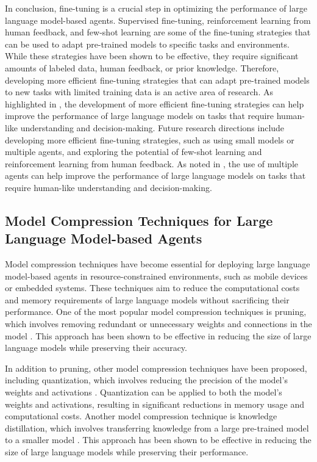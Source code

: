 \documentclass[11pt,a4paper]{article}
\begin{document}
In conclusion, fine-tuning is a crucial step in optimizing the performance of large language model-based agents. Supervised fine-tuning, reinforcement learning from human feedback, and few-shot learning are some of the fine-tuning strategies that can be used to adapt pre-trained models to specific tasks and environments. While these strategies have been shown to be effective, they require significant amounts of labeled data, human feedback, or prior knowledge. Therefore, developing more efficient fine-tuning strategies that can adapt pre-trained models to new tasks with limited training data is an active area of research. As highlighted in \cite{doi:10.34133/research.0655}, the development of more efficient fine-tuning strategies can help improve the performance of large language models on tasks that require human-like understanding and decision-making. Future research directions include developing more efficient fine-tuning strategies, such as using small models or multiple agents, and exploring the potential of few-shot learning and reinforcement learning from human feedback. As noted in \cite{arxiv:2404.01023}, the use of multiple agents can help improve the performance of large language models on tasks that require human-like understanding and decision-making.


\subsection{Model Compression Techniques for Large Language Model-based Agents}


Model compression techniques have become essential for deploying large language model-based agents in resource-constrained environments, such as mobile devices or embedded systems. These techniques aim to reduce the computational costs and memory requirements of large language models without sacrificing their performance. One of the most popular model compression techniques is pruning, which involves removing redundant or unnecessary weights and connections in the model \cite{doi:10.1162/coli_a_00107}. This approach has been shown to be effective in reducing the size of large language models while preserving their accuracy.

In addition to pruning, other model compression techniques have been proposed, including quantization, which involves reducing the precision of the model's weights and activations \cite{arxiv:1412.6980}. Quantization can be applied to both the model's weights and activations, resulting in significant reductions in memory usage and computational costs. Another model compression technique is knowledge distillation, which involves transferring knowledge from a large pre-trained model to a smaller model \cite{arxiv:2402.15627}. This approach has been shown to be effective in reducing the size of large language models while preserving their performance.
\end{document}
